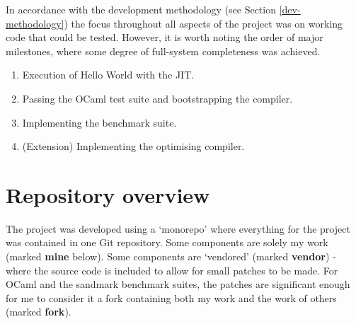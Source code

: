 In accordance with the development methodology (see Section \ref{dev-methodology}) the focus
throughout all aspects of the project was on working code that could be tested. However, it is
worth
noting the order of major milestones, where some degree of full-system completeness was achieved.

\begin{enumerate}
      \item Execution of Hello World with the JIT.
      \item Passing the OCaml test suite and bootstrapping the compiler.
      \item Implementing the benchmark suite.
      \item (Extension) Implementing the optimising compiler.
\end{enumerate}

\section{Repository overview}

The project was developed using a `monorepo' where everything for the project was contained in one
Git repository. Some components are solely my work (marked \textbf{mine} below). Some components
are `vendored' (marked \textbf{vendor}) - where the source code is included to allow for small
patches to be made. For OCaml and the sandmark benchmark suites, the patches are significant enough
for me to consider it a fork containing both my work and the work of others (marked \textbf{fork}).


